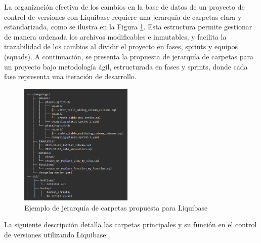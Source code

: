 \documentclass{IEEEtran}
\begin{document}
La organización efectiva de los cambios en la base de datos de un proyecto de control de versiones con Liquibase requiere una jerarquía de carpetas clara y estandarizada, como se ilustra en la Figura \ref{fig:folderHerarchyLiquibase}. Esta estructura permite gestionar de manera ordenada los archivos modificables e inmutables, y facilita la trazabilidad de los cambios al dividir el proyecto en fases, sprints y equipos (squads). A continuación, se presenta la propuesta de jerarquía de carpetas para un proyecto bajo metodología ágil, estructurada en fases y sprints, donde cada fase representa una iteración de desarrollo.

\begin{figure}[H]
    \centering
    \includegraphics[width=0.48\textwidth]{images/folderHerarchyLiquibase.png}
    \caption{Ejemplo de jerarquía de carpetas propuesta para Liquibase}
    \label{fig:folderHerarchyLiquibase}
\end{figure}

 La siguiente descripción detalla las carpetas principales y su función en el control de versiones utilizando Liquibase:
\end{document}
